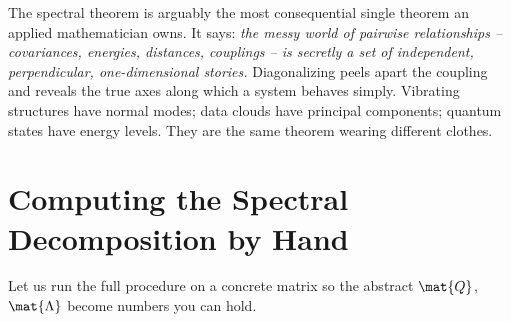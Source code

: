 \begin{aestheticbox}
The spectral theorem is arguably the most consequential single theorem an applied
mathematician owns. It says: \emph{the messy world of pairwise relationships --
covariances, energies, distances, couplings -- is secretly a set of independent,
perpendicular, one-dimensional stories.} Diagonalizing peels apart the coupling
and reveals the true axes along which a system behaves simply. Vibrating
structures have normal modes; data clouds have principal components; quantum
states have energy levels. They are the same theorem wearing different clothes.
\end{aestheticbox}

\section{Computing the Spectral Decomposition by Hand}
\label{ch26:computing}

Let us run the full procedure on a concrete matrix so the abstract $\mat{Q}$,
$\mat{\Lambda}$ become numbers you can hold.


